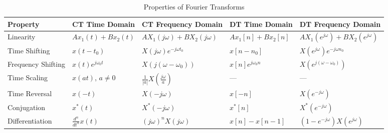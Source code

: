 \documentclass[8pt]{article}
\begin{document}
\begin{multicols}{2}
    \begin{table*}[ht]
        \centering
        \caption{Properties of Fourier Transforms}
        \label{tab:fourier_transform_properties}
        \small
        \begin{tabular}{@{}lllll@{}}
            \toprule
            \textbf{Property}  & \textbf{CT Time Domain}             & \textbf{CT Frequency Domain}                                  & \textbf{DT Time Domain}            & \textbf{DT Frequency Domain}                                                                            \\
            \midrule
            Linearity          & $A x_1(t) + B x_2(t)$               & $A X_1(j\omega) + B X_2(j\omega)$                             & $A x_1[n] + B x_2[n]$              & $A X_1(e^{j\omega}) + B X_2(e^{j\omega})$                                                               \\ [1mm]
            Time Shifting      & $x(t - t_0)$                        & $X(j\omega)e^{-j\omega t_0}$                                  & $x[n - n_0]$                       & $X(e^{j\omega})e^{-j\omega n_0}$                                                                        \\ [1mm]
            Frequency Shifting & $x(t)e^{j\omega_0 t}$               & $X(j(\omega - \omega_0))$                                     & $x[n]e^{j\omega_0 n}$              & $X(e^{j(\omega - \omega_0)})$                                                                           \\ [1mm]
            Time Scaling       & $x(at)$, $a \neq 0$                 & $\frac{1}{|a|}X\left(\frac{j\omega}{a}\right)$                & ---                                & ---                                                                                                     \\ [1mm]
            Time Reversal      & $x(-t)$                             & $X(-j\omega)$                                                 & $x[-n]$                            & $X(e^{-j\omega})$                                                                                       \\ [1mm]
            Conjugation        & $x^*(t)$                            & $X^*(-j\omega)$                                               & $x^*[n]$                           & $X^*(e^{-j\omega})$                                                                                     \\ [1mm]
            Differentiation    & $\frac{d^n}{dt^n}x(t)$              & $(j\omega)^n X(j\omega)$                                      & $x[n] - x[n-1]$                    & $(1 - e^{-j\omega})X(e^{j\omega})$                                                                      \\ [1mm]

\end{tabular}
\end{table*}
\end{multicols}
\end{document}
